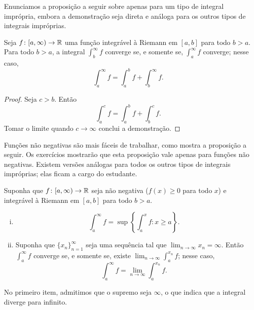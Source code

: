 Enunciamos a proposição a seguir sobre  apenas para um tipo
de integral imprópria, embora a demonstração seja direta e análoga para os
outros tipos de integrais impróprias.

\begin{prop} \label{impropriemann:tail}
Seja $f \colon [a,\infty) \to {\mathbb{R}}$ uma função integrável à Riemann
em $[a,b]$ para todo $b > a$.
Para todo $b > a$, a integral
$\int_b^\infty f$ converge se, e somente se, $\int_a^\infty f$
converge; nesse caso,
\begin{equation*}
\int_a^\infty f
=
\int_a^b f +
\int_b^\infty f .
\end{equation*}
\end{prop}

\begin{proof}
Seja $c > b$. Então
\begin{equation*}
\int_a^c f
=
\int_a^b f +
\int_b^c f .
\end{equation*}
Tomar o limite quando $c \to \infty$ conclui a demonstração.
\end{proof}

Funções não negativas são mais fáceis de trabalhar,
como mostra a proposição a seguir.
Os exercícios mostrarão que esta proposição
vale apenas para funções não negativas.
Existem versões análogas para todos os outros tipos de integrais impróprias;
elas ficam a cargo do estudante.

\begin{prop} \label{impropriemann:possimp}
Suponha que $f \colon [a,\infty) \to {\mathbb{R}}$ seja não negativa
($f(x) \geq 0$ para todo $x$) e integrável à Riemann em $[a,b]$ para todo
$b > a$.
\begin{enumerate}[(i)]
\item 
\begin{equation*}
\int_a^\infty f = \sup \left\{ \int_a^x f : x \geq a \right\} .
\end{equation*}
\item
Suponha que $\{ x_n \}_{n=1}^\infty$
seja uma sequência tal que $\lim_{n\to\infty} x_n = \infty$. Então
$\int_a^\infty f$ converge se, e somente se, existe
$\lim_{n\to\infty} \int_a^{x_n} f$; nesse caso,
\begin{equation*}
\int_a^\infty f = \lim_{n\to\infty} \int_a^{x_n} f .
\end{equation*}
\end{enumerate}
\end{prop}

No primeiro item, admitimos que o supremo seja $\infty$,
o que indica que a integral diverge para infinito.

